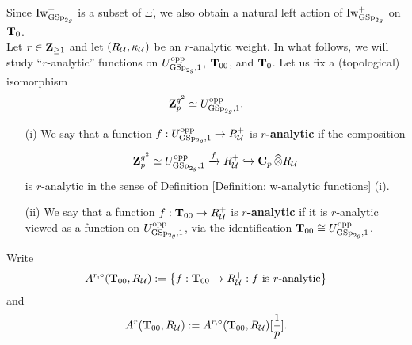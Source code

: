 Since $\Iw_{\GSp_{2g}}^+$ is a subset of $\Xi$, we also obtain a natural left action of $\Iw_{\GSp_{2g}}^+$ on $\T_0$.\\ 

Let $r\in \Z_{\geq 1}$ and let $(R_{\calU}, \kappa_{\calU})$ be an $r$-analytic weight. In what follows, we will study ``$r$-analytic'' functions on $U_{\GSp_{2g}, 1}^{\opp}$, $\T_{00}$, and $\T_0$. Let us fix a (topological) isomorphism $$\Z_p^{g^2}\simeq U_{\GSp_{2g}, 1}^{\opp}.$$ 

\begin{Definition}
\begin{enumerate}
\item[(i)] We say that a function $f: U_{\GSp_{2g}, 1}^{\opp}\rightarrow R^+_{\calU}$ is \textbf{$r$-analytic} if the composition
$$\Z_p^{g^2}\simeq U_{\GSp_{2g}, 1}^{\opp}\xrightarrow[]{f}R_{\calU}^+\hookrightarrow \C_p\widehat{\otimes}R_{\calU}$$
is $r$-analytic in the sense of Definition \ref{Definition: w-analytic functions} (i). 
\item[(ii)] We say that a function $f: \T_{00}\rightarrow R^+_{\calU}$ is \textbf{$r$-analytic} if it is $r$-analytic viewed as a function on $U^{\opp}_{\GSp_{2g}, 1}$, via the identification $\T_{00}\cong U^{\opp}_{\GSp_{2g}, 1}$.
\end{enumerate}
\end{Definition}

Write $$A^{r, \circ}(\T_{00}, R_{\calU}):=\left\{f: \T_{00}\rightarrow R_{\calU}^+: f \text{ is $r$-analytic} \right\}$$ 
and 
$$A^r(\T_{00}, R_{\calU}):=A^{r, \circ}(\T_{00}, R_{\calU})[\frac{1}{p}].$$ 

